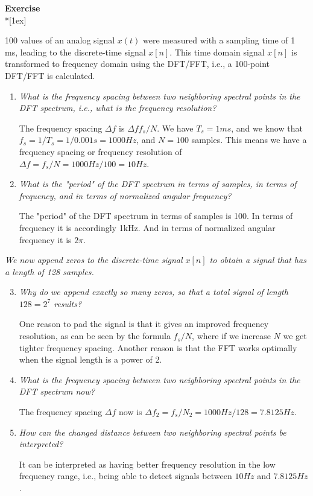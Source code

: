 \documentclass[12pt,a4paper,austrian]{article}
\newcounter{theaufgabe}\setcounter{theaufgabe}{1}
\newenvironment{aufgabe}[1]%
  {\bigskip\par\noindent\begin{nopagebreak}
   \textsf{\textbf{Exercise \arabic{theaufgabe}}}\quad
      \textsf{\textit{#1}}\\*[1ex]%
\stepcounter{theaufgabe}\hspace{2ex}\end{nopagebreak}}
  {\par\pagebreak[2]}
\begin{document}
\begin{aufgabe}{} %

  100 values of an analog signal $x(t)$ were measured with a sampling time of 1 ms, leading to the
discrete-time signal $x[n]$. This time domain signal $x[n]$ is transformed to frequency domain using the DFT/FFT, i.e., a 100-point DFT/FFT is calculated.

  \begin{enumerate}
    \item \emph{What is the frequency spacing between two neighboring spectral points in the DFT spectrum, i.e., what is the frequency resolution?}

    The frequency spacing $\Delta f$ is $\Delta f f_s / N$. We have $T_s = 1ms$, and we know that $f_s = 1/T_s = 1/0.001s = 1000Hz$, and $N = 100$ samples. This means we have a frequency spacing or frequency resolution of $\Delta f = f_s / N = 1000Hz / 100 = 10Hz$.

    \item \emph{What is the "period" of the DFT spectrum in terms of samples, in terms of frequency, and in terms of normalized angular frequency?}

    The "period" of the DFT spectrum in terms of samples is 100. In terms of frequency it is accordingly 1kHz. And in terms of normalized angular frequency it is $2 \pi$.

  \end{enumerate}

  \emph{We now append zeros to the discrete-time signal $x[n]$ to obtain a signal that has a length of 128 samples.}

  \begin{enumerate}\setcounter{enumi}{2}
    \item \emph{Why do we append exactly so many zeros, so that a total signal of length $128 = 2^7$ results?}
    
    One reason to pad the signal is that it gives an improved frequency resolution, as can be seen by the formula $f_s / N$, where if we increase $N$ we get tighter frequency spacing. Another reason is that the FFT works optimally when the signal length is a power of 2.

    \item \emph{What is the frequency spacing between two neighboring spectral points in the DFT spectrum
    now?}

    The frequency spacing $\Delta f$ now is $\Delta f_2 = f_s / N_2 = 1000Hz / 128 = 7.8125Hz$.

    \item \emph{How can the changed distance between two neighboring spectral points be interpreted?}

    It can be interpreted as having better frequency resolution in the low frequency range, i.e., being able to detect signals between $10Hz$ and $7.8125Hz$.

  \end{enumerate}

\end{aufgabe} \pagebreak
\end{document}
